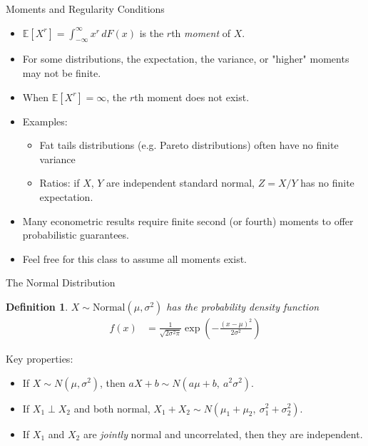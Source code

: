 \documentclass[aspectratio=169, handout, t]{beamer}
\newtheorem{defn}{Definition}
\numberwithin{equation}{section}
\begin{document}
\begin{frame}{Moments and Regularity Conditions}
\begin{itemize}
\item $\mathbb{E}[X^r]=\int_{-\infty}^{\infty}x^{r}\,dF(x)$ is the $r$th \emph{moment} of $X$.
\item For some distributions, the expectation, the variance, or "higher" moments may not be finite.
\item When $\mathbb{E}[X^r]=\infty$, the $r$th moment does not exist.
\item Examples:
\begin{itemize}
\item Fat tails distributions (e.g. Pareto distributions) often have no finite variance
\item Ratios: if $X$, $Y$ are independent standard normal, $Z=X/Y$ has no finite expectation.
\end{itemize}
\item Many econometric results require finite second (or fourth) moments to offer probabilistic guarantees.
\item Feel free for this class to assume all moments exist.
\end{itemize}
\end{frame}

\begin{frame}{The Normal Distribution}
\begin{defn}
$X \sim \text{Normal}(\mu, \sigma^2)$ has the probability density function
\begin{align*}
f(x) & =  \frac{1}{\sqrt{2\sigma^2\pi}}\exp\left(-\frac{(x - \mu)^2}{2\sigma^2}\right)
\end{align*}
\end{defn}
Key properties:
\begin{itemize}
\item If $X\sim N(\mu, \sigma^2)$, then $aX+b \sim N(a\mu+b,\ a^2\sigma^2)$.
\item If $X_1 \perp X_2$ and both normal, $X_1+X_2 \sim N(\mu_1+\mu_2,\ \sigma_1^2+\sigma_2^2)$.
\item If $X_1$ and $X_2$ are \emph{jointly} normal and uncorrelated, then they are independent.
\end{itemize}
\end{frame}
\end{document}
